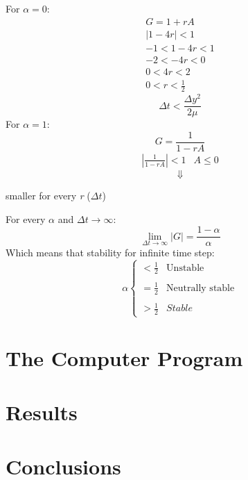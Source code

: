 \documentclass[11pt, a4paper]{article}
\begin{document}
For $\alpha = 0$:
\begin{align*}
        G = 1+rA\\
        \left|1-4r\right| < 1\\
        -1< 1-4r <1\\
        -2< -4r <0\\
        0< 4r <2\\
        0< r <\frac{1}{2}
\end{align*}
\begin{equation}
    \Delta t < \frac{\Delta y^2}{2\mu}
\end{equation}
For $\alpha = 1$:
\begin{equation*}
    G = \frac{1}{1-rA}
\end{equation*}
\begin{equation}
    \begin{matrix}
        \displaystyle\left|\frac{1}{1-rA}\right|<1 & A \leq 0
    \end{matrix}
\end{equation}
$$\Downarrow$$
\begin{center}
    smaller for every \emph{r} ($\Delta t$)
\end{center}
For every $\alpha$ and $\Delta t\rightarrow\infty$:
\begin{equation}
    \lim_{\Delta t\rightarrow\infty}\left|G\right|=\frac{1-\alpha}{\alpha}
\end{equation}
Which means that stability for infinite time step:
\begin{equation}
    \alpha \left\{\begin{matrix}
        \displaystyle<\frac{1}{2} & \text{Unstable} \\\\
        \displaystyle=\frac{1}{2} & \text{Neutrally stable} \\\\
        \displaystyle>\frac{1}{2} & Stable
    \end{matrix}\right.
\end{equation}



\newpage

\section{The Computer Program}
\newpage

\section{Results}
\newpage

\section{Conclusions}
\newpage
\end{document}
